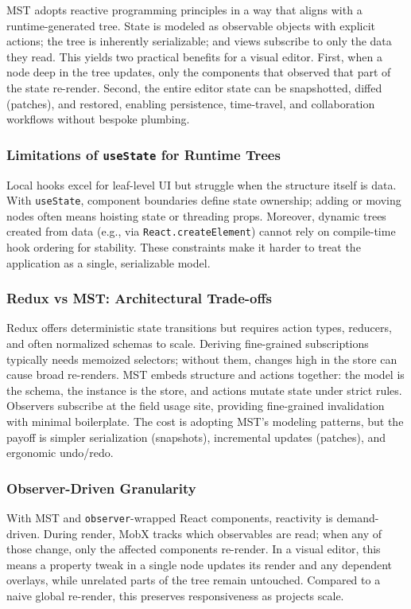 \documentclass[oneside,12pt]{book}
\begin{document}
MST adopts reactive programming principles \cite{bainomugisha2013survey} in a way that aligns with a runtime-generated tree. State is modeled as observable objects with explicit actions; the tree is inherently serializable; and views subscribe to only the data they read. This yields two practical benefits for a visual editor. First, when a node deep in the tree updates, only the components that observed that part of the state re-render. Second, the entire editor state can be snapshotted, diffed (patches), and restored, enabling persistence, time-travel, and collaboration workflows without bespoke plumbing.

\subsubsection{Limitations of \texttt{useState} for Runtime Trees}
Local hooks excel for leaf-level UI but struggle when the structure itself is data. With \texttt{useState}, component boundaries define state ownership; adding or moving nodes often means hoisting state or threading props. Moreover, dynamic trees created from data (e.g., via \texttt{React.createElement}) cannot rely on compile-time hook ordering for stability. These constraints make it harder to treat the application as a single, serializable model.

\subsubsection{Redux vs MST: Architectural Trade-offs}
Redux offers deterministic state transitions but requires action types, reducers, and often normalized schemas to scale. Deriving fine-grained subscriptions typically needs memoized selectors; without them, changes high in the store can cause broad re-renders. MST embeds structure and actions together: the model is the schema, the instance is the store, and actions mutate state under strict rules. Observers subscribe at the field usage site, providing fine-grained invalidation with minimal boilerplate. The cost is adopting MST's modeling patterns, but the payoff is simpler serialization (snapshots), incremental updates (patches), and ergonomic undo/redo.

\subsubsection{Observer-Driven Granularity}
With MST and \texttt{observer}-wrapped React components, reactivity is demand-driven. During render, MobX tracks which observables are read; when any of those change, only the affected components re-render. In a visual editor, this means a property tweak in a single node updates its render and any dependent overlays, while unrelated parts of the tree remain untouched. Compared to a naive global re-render, this preserves responsiveness as projects scale.
\end{document}
